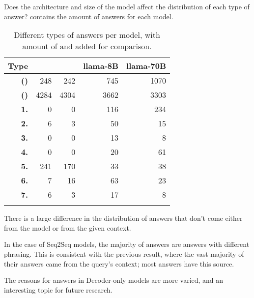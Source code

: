 Does the architecture and size of the model affect the distribution of each type of \Other{} answer?
 contains the amount of answers for each model.

\begin{table}[ht]
	\centering
	\footnotesize
	\begin{tabular}{>{\bfseries}r | r r r r}
		\toprule
			\bfseries Type & \ttfamily\scriptsize \smallflan{} & \ttfamily\scriptsize \bigflan{} & \ttfamily\scriptsize llama-8B & \ttfamily\scriptsize llama-70B \\
		\midrule
			(\Pc{}) & 248 & 242 & 745 & 1070 \\
			(\Cc{}) & 4284 & 4304 & 3662 & 3303 \\
		\midrule
			1. & 0 & 0 & 116 & 234 \\
			2. & 6 & 3 & 50 & 15 \\
			3. & 0 & 0 & 13 & 8 \\
			4. & 0 & 0 & 20 & 61 \\
			5. & 241 & 170 & 33 & 38 \\
			6. & 7 & 16 & 63 & 23 \\
			7. & 6 & 3 & 17 & 8 \\
		\bottomrule \addlinespace[4pt]
	\end{tabular}
	\caption{Different types of \Other{} answers per model, with amount of \Parametric{} and \Contextual{} added for comparison.}
	\label{other_results_category}
\end{table}

There is a large difference in the distribution of answers that don't come either from the model or from the given context.

In the case of Seq2Seq models, the majority of \Other{} answers are \Contextual{} answers with different phrasing.
This is consistent with the previous result, where the vast majority of their answers came from the query's context; most \Other{} answers have this source.

The reasons for \Other{} answers in Decoder-only models are more varied, and an interesting topic for future research.
